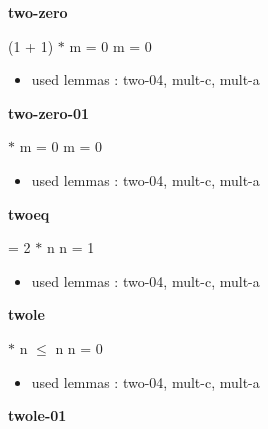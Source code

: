 \documentclass[a4paper]{article}
\begin{document}
\medskip

\bigskip

{\large\bf two-zero}

\medskip

 \Fol (1 + 1) $*$ m = 0 \Equiv m = 0

\begin{itemize}


\item       used lemmas  : two-04, mult-c, mult-a

\end{itemize}

\medskip

\bigskip

{\large\bf two-zero-01}

\medskip

  $*$ m = 0 \Equiv m = 0

\begin{itemize}


\item       used lemmas  : two-04, mult-c, mult-a

\end{itemize}

\medskip

\bigskip

{\large\bf twoeq}

\medskip

  = 2 $*$ n \Equiv n = 1

\begin{itemize}


\item       used lemmas  : two-04, mult-c, mult-a

\end{itemize}

\medskip

\bigskip

{\large\bf twole}

\medskip

  $*$ n $\le$ n \Equiv n = 0

\begin{itemize}


\item       used lemmas  : two-04, mult-c, mult-a

\end{itemize}

\medskip

\bigskip

{\large\bf twole-01}
\end{document}
